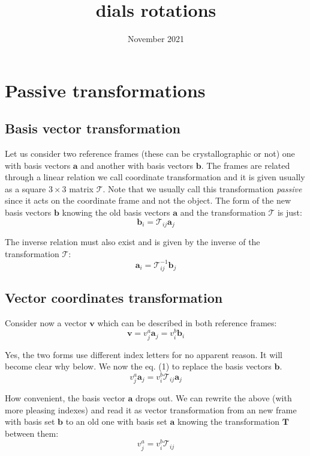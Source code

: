 \documentclass{article}
\title{dials rotations}
\date{November 2021}
\begin{document}
\maketitle

\section{Passive transformations}
\subsection{Basis vector transformation}
Let us consider two reference frames (these can be crystallographic or not) one with basis vectors $\mathbf{a}$ and  another with basis vectors $\mathbf{b}$. The frames are related through a linear relation we call coordinate transformation and it is given usually as a square $3\times3$ matrix $\mathcal{T}$. Note that we usually call this transformation \textit{passive} since it acts on the coordinate frame and not the object. The form of the new basis vectors $\mathbf{b}$ knowing the old basis vectors $\mathbf{a}$ and the transformation $\mathcal{T}$ is just:
\begin{equation}
    \mathbf{b}_{i} = \mathcal{T}_{ij} \mathbf{a}_j
\end{equation}

The inverse relation must also exist and is given by the inverse of the transformation $\mathcal{T}$:
\begin{equation}
    \mathbf{a}_{i} = \mathcal{T}^{-1}_{ij} \mathbf{b}_j
\end{equation}

\subsection{Vector coordinates transformation} 
Consider now a vector $\mathbf{v}$ which can be described in both reference frames:
\begin{equation}
    \mathbf{v} = v^a_j \mathbf{a}_j = v^b_i \mathbf{b}_i 
\end{equation}

Yes, the two forms use different index letters for no apparent reason. It will become clear why below.
We now the eq. (1) to replace the basis vectors $\mathbf{b}$.
\begin{equation}
    v^a_j \mathbf{a}_j = v^b_i \mathcal{T}_{ij} \mathbf{a}_j
\end{equation}

How convenient, the basis vector $\mathbf{a}$ drops out. We can rewrite the above (with more pleasing indexes) and read it as vector transformation from an new frame with basis set $\mathbf{b}$ to an old one with basis set $\mathbf{a}$ knowing the transformation $\mathbf{T}$ between them:
\begin{equation}
    v^a_j = v^b_i \mathcal{T}_{ij}
\end{equation}
\end{document}
